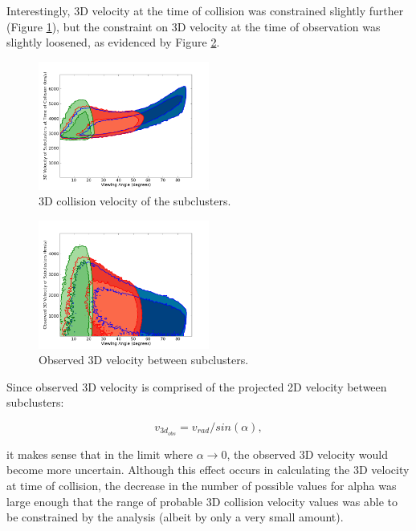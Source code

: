 \documentclass[12 pt]{article}
\renewcommand{\baselinestretch}{2}
\begin{document}
Interestingly, 3D velocity at the time of collision was constrained slightly further (Figure \ref{velcol}), but the constraint on 3D velocity at the time of observation was slightly loosened, as evidenced by Figure \ref{velobs}. 

\renewcommand{\baselinestretch}{1}
\begin{figure}[h]
\caption{3D collision velocity of the subclusters.}
\label{velcol}
\centering
\includegraphics[width=0.5\textwidth]{alpha_v_3d_col}
\end{figure}
\renewcommand{\baselinestretch}{2}

\renewcommand{\baselinestretch}{1}
\begin{figure}[h]
\caption{Observed 3D velocity between subclusters.}
\label{velobs}
\centering
\includegraphics[width=0.5\textwidth]{alpha_v_3d_obs}
\end{figure}
\renewcommand{\baselinestretch}{2}

Since observed 3D velocity is comprised of the projected 2D velocity between subclusters:

\renewcommand{\baselinestretch}{1}
\begin{equation}
\label{veq}
v_{3d_{obs}} = v_{rad} / sin(\alpha),
\end{equation}
\renewcommand{\baselinestretch}{2}

it makes sense that in the limit where $\alpha \rightarrow 0 $, the observed 3D velocity would become more uncertain. Although this effect occurs in calculating the 3D velocity at time of collision, the decrease in the number of possible values for alpha was large enough that the range of probable 3D collision velocity values was able to be constrained by the analysis (albeit by only a very small amount). 
\end{document}
